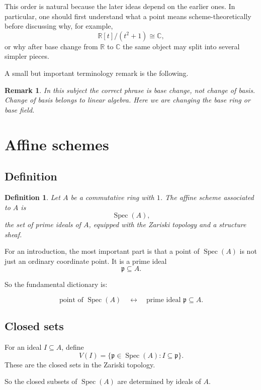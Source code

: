 \documentclass[12pt,a4paper]{article}
\theoremstyle{notespace}
\newtheorem{definition}{Definition}[section]
\newtheorem{remark}{Remark}[section]
\newcommand{\Spec}{\operatorname{Spec}}
\newcommand{\R}{\mathbb R}
\newcommand{\C}{\mathbb C}
\newcommand{\p}{\mathfrak p}
\theoremstyle{definition}
\begin{document}
	This order is natural because the later ideas depend on the earlier ones.  
	In particular, one should first understand what a point means scheme-theoretically before discussing why, for example,
	\[
	\R[t]/(t^2+1)\cong \C,
	\]
	or why after base change from \(\R\) to \(\C\) the same object may split into several simpler pieces.
	
	A small but important terminology remark is the following.
	
	\begin{remark}
		In this subject the correct phrase is \emph{base change}, not \emph{change of basis}.  
		Change of basis belongs to linear algebra.  
		Here we are changing the base ring or base field.
	\end{remark}
	
	\section{Affine schemes}
	
	\subsection{Definition}
	
	\begin{definition}
		Let \(A\) be a commutative ring with \(1\).  
		The \emph{affine scheme} associated to \(A\) is
		\[
		\Spec(A),
		\]
		the set of prime ideals of \(A\), equipped with the Zariski topology and a structure sheaf.
	\end{definition}
	
	For an introduction, the most important part is that a point of \(\Spec(A)\) is not just an ordinary coordinate point.  
	It is a prime ideal
	\[
	\p\subseteq A.
	\]
	
	So the fundamental dictionary is:
	
	\[
	\text{point of }\Spec(A)
	\quad\longleftrightarrow\quad
	\text{prime ideal }\p\subseteq A.
	\]
	
	\subsection{Closed sets}
	
	For an ideal \(I\subseteq A\), define
	\[
	V(I)=\{\p\in \Spec(A): I\subseteq \p\}.
	\]
	These are the closed sets in the Zariski topology.
	
	So the closed subsets of \(\Spec(A)\) are determined by ideals of \(A\).
	
\end{document}
